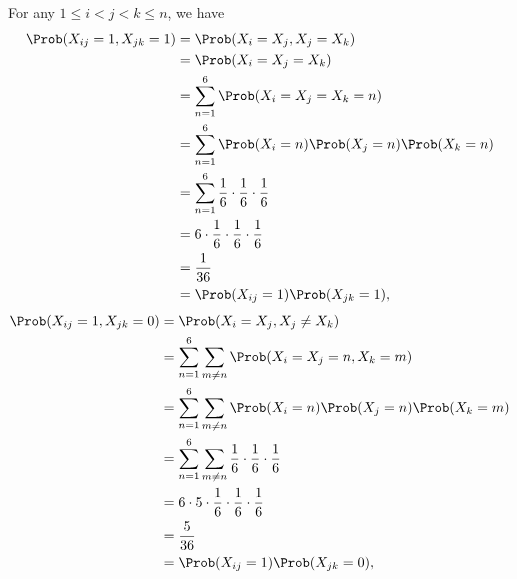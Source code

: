 \begin{enumerate}
          For any \(1 \leq i < j < k \leq n\), we have
          \begin{align*}
              \Prob(X_{ij} = 1, X_{jk} = 1) & = \Prob(X_i = X_j, X_j = X_k)                                      \\
                                            & = \Prob(X_i = X_j = X_k)                                           \\
                                            & = \sum_{n = 1}^{6} \Prob(X_i = X_j = X_k = n)                      \\
                                            & = \sum_{n = 1}^{6} \Prob(X_i = n) \Prob(X_j = n) \Prob(X_k = n)    \\
                                            & = \sum_{n = 1}^{6} \frac{1}{6} \cdot \frac{1}{6} \cdot \frac{1}{6} \\
                                            & = 6 \cdot \frac{1}{6} \cdot \frac{1}{6} \cdot \frac{1}{6}          \\
                                            & = \frac{1}{36}                                                     \\
                                            & = \Prob(X_{ij} = 1) \Prob(X_{jk} = 1),
          \end{align*}
          \begin{align*}
              \Prob(X_{ij} = 1, X_{jk} = 0) & = \Prob(X_i = X_j, X_j \neq X_k)                                                   \\
                                            & = \sum_{n = 1}^{6} \sum_{m \neq n} \Prob(X_i = X_j = n, X_k = m)                   \\
                                            & = \sum_{n = 1}^{6} \sum_{m \neq n} \Prob(X_i = n) \Prob(X_j = n) \Prob(X_k = m)    \\
                                            & = \sum_{n = 1}^{6} \sum_{m \neq n} \frac{1}{6} \cdot \frac{1}{6} \cdot \frac{1}{6} \\
                                            & = 6 \cdot 5 \cdot \frac{1}{6} \cdot \frac{1}{6} \cdot \frac{1}{6}                  \\
                                            & = \frac{5}{36}                                                                     \\
                                            & =  \Prob(X_{ij} = 1) \Prob(X_{jk} = 0),
          \end{align*}

\end{enumerate}
